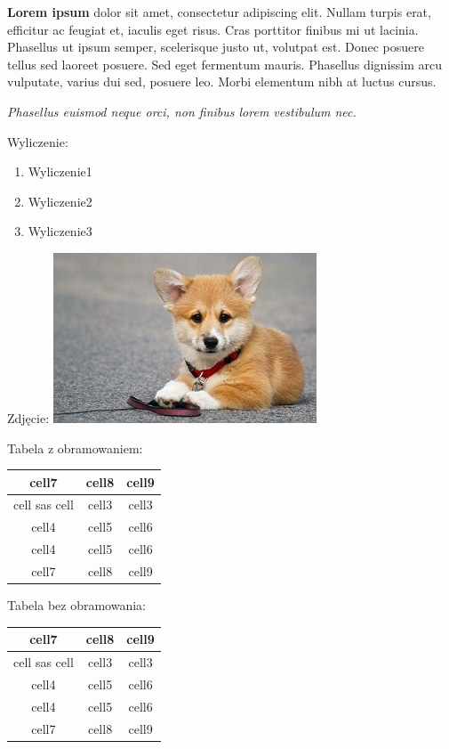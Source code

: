 \documentclass{report}
\begin{document}
    \textbf{Lorem ipsum} dolor sit amet, consectetur adipiscing elit. 
    Nullam turpis erat, efficitur ac feugiat et, iaculis eget 
    risus. Cras porttitor finibus mi ut lacinia. Phasellus ut 
    ipsum semper, scelerisque justo ut, volutpat est. \newline Donec posuere 
    tellus sed laoreet posuere. Sed eget fermentum mauris. Phasellus 
    dignissim arcu vulputate, varius dui sed, posuere leo. Morbi 
    elementum nibh at luctus cursus. 

    \textit{Phasellus euismod neque orci, non finibus lorem vestibulum nec.}
 

    Wyliczenie: 
    \begin{enumerate}
        \item Wyliczenie1
        \item Wyliczenie2
        \item Wyliczenie3
    \end{enumerate}

    Zdjęcie:
    \includegraphics{../corgi.jpg}

    Tabela z obramowaniem:
    \begin{tabular}{| c | c | c |}
        \hline
        \hline
        cell7 & cell8 & cell9\\
        \hline
        cell sas cell & cell3 & cell3 \\
        cell4 & cell5 & cell6 \\
        cell4 & cell5 & cell6 \\
        cell7 & cell8 & cell9  
   \end{tabular}

   Tabela bez obramowania:
   \begin{tabular}{c c c}
        \hline
        \hline
        cell7 & cell8 & cell9\\
        \hline
        cell sas cell & cell3 & cell3 \\
        cell4 & cell5 & cell6 \\
        cell4 & cell5 & cell6 \\
        cell7 & cell8 & cell9  
    \end{tabular}
\end{document}
